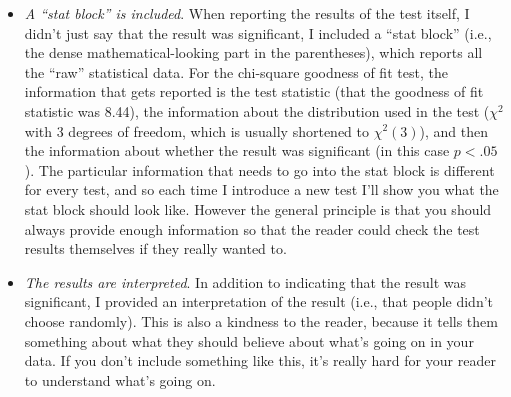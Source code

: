 \begin{itemize}
\item {\it A ``stat block'' is included}. When reporting the results of the test itself, I didn't just say that the result was significant, I included a ``stat block'' (i.e., the dense mathematical-looking part in the parentheses), which reports all the ``raw'' statistical data. For the chi-square goodness of fit test, the information that gets reported is the test statistic (that the goodness of fit statistic was 8.44), the information about the distribution used in the test ($\chi^2$ with 3 degrees of freedom, which is usually shortened to $\chi^2(3)$), and then the information about whether the result was significant (in this case $p<.05$). The particular information that needs to go into the stat block is different for every test, and so each time I introduce a new test I'll show you what the stat block should look like. However the general principle is that you should always provide enough information so that the reader could check the test results themselves if they really wanted to. 
\item {\it The results are interpreted}. In addition to indicating that the result was significant, I provided an interpretation of the result (i.e., that people didn't choose randomly). This is also a kindness to the reader, because it tells them something about what they should believe about what's going on in your data. If you don't include something like this, it's really hard for your reader to understand what's going on.
\end{itemize}

